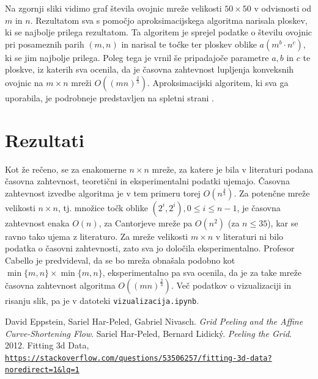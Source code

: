 \documentclass[a4paper]{article}
\begin{document}
Na zgornji sliki vidimo graf števila ovojnic mreže velikosti $50 \times 50$ v odvisnosti od $m$ in $n$. Rezultatom sva s pomočjo aproksimacijskega algoritma narisala ploskev, ki se najbolje
prilega rezultatom. Ta algoritem je sprejel podatke o številu ovojnic pri posameznih parih $(m, n)$ in narisal te točke ter ploskev oblike $a(m^b \cdot n^c)$, ki se jim najbolje prilega.
Poleg tega je vrnil še pripadajoče parametre $a, b$ in $c$ te ploskve, iz katerih sva ocenila, da je časovna zahtevnost lupljenja konveksnih ovojnic na $m \times n$ mreži 
$O((mn)^{\frac{2}{3}})$. Aproksimacijski algoritem, ki sva ga uporabila, je podrobneje predstavljen na spletni strani \cite{aproksimacija}.

\section{Rezultati}
Kot že rečeno, se za enakomerne $n \times n$ mreže, za katere je bila v literaturi podana časovna zahtevnost, teoretični in eksperimentalni podatki ujemajo. Časovna zahtevnost izvedbe algoritma
je v tem primeru torej $O(n ^ \frac{4}{3})$. Za potenčne mreže velikosti $n \times n$, tj. množice točk oblike $(2^i, 2^i), 0 \leq i \leq n - 1$, je časovna zahtevnost enaka
$O(n)$, za Cantorjeve mreže pa $O(n^2)$ (za $n \leq 35$), kar se ravno tako ujema z literaturo.
Za mreže velikosti $m \times n$ v literaturi ni bilo podatka o časovni zahtevnosti, zato sva jo določila eksperimentalno. Profesor Cabello je predvideval,
da se bo mreža obnašala podobno kot $\min\{m, n\} \times \min\{m,n\}$, eksperimentalno
pa sva ocenila, da je za take mreže časovna zahtevnost algoritma $O((mn)^{\frac{2}{3}})$. Več podatkov o vizualizaciji in risanju slik, pa je v datoteki \texttt{vizualizacija.ipynb}.

\begin{thebibliography}{3}
    David Eppstein, Sariel Har-Peled, Gabriel Nivasch. \textit{Grid Peeling and the Affine Curve-Shortening Flow}.
    Sariel Har-Peled, Bernard Lidický. \textit{Peeling the Grid}. 2012.
    Fitting 3d Data, \\\href{https://stackoverflow.com/questions/53506257/fitting-3d-data?noredirect=1&lq=1}
    {\texttt{https://stackoverflow.com/questions/53506257/fitting-3d-data?noredirect=1\&lq=1}}
\end{thebibliography}
\end{document}

